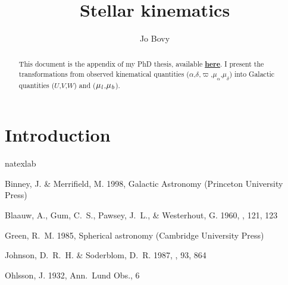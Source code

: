 \documentclass[12pt,preprint]{aastex}
\newcommand{\ra}{\ensuremath{\alpha}}
\newcommand{\dec}{\ensuremath{\delta}}
\newcommand{\pmra}{\ensuremath{\mu_{\ra}}}
\newcommand{\pmdec}{\ensuremath{\mu_{\dec}}}
\newcommand{\gall}{{\it l}}
\newcommand{\galb}{{\it b}}
\newcommand{\pmll}{\ensuremath{\mu_\gall}}
\newcommand{\pmbb}{\ensuremath{\mu_\galb}}
\newcommand{\galU}{\ensuremath{U}}
\newcommand{\galV}{\ensuremath{V}}
\newcommand{\galW}{\ensuremath{W}}
\newcommand{\parallax}{\ensuremath{\varpi}}
\begin{document}
\title{Stellar kinematics}
\author{
  Jo Bovy}

\begin{abstract}
This document is the appendix of my PhD thesis, available
{\bf \href{http://adsabs.harvard.edu/abs/2011PhDT........86B}{here}}. I
present the transformations from observed kinematical quantities
(\ra,\dec,\parallax,\pmra,\pmdec) into Galactic quantities
(\galU,\galV,\galW) and (\pmll,\pmbb).
\end{abstract}



\section{Introduction}








\begin{thebibliography}{5}
\expandafter\ifx\csname natexlab\endcsname\relax\def\natexlab#1{#1}\fi

{Binney}, J. \& {Merrifield}, M. 1998, {Galactic Astronomy} (Princeton
  University Press)

{Blaauw}, A., {Gum}, C.~S., {Pawsey}, J.~L., \& {Westerhout}, G. 1960, \mnras,
  121, 123

{Green}, R.~M. 1985, {Spherical astronomy} (Cambridge University Press)

{Johnson}, D.~R.~H. \& {Soderblom}, D.~R. 1987, \aj, 93, 864

{Ohlsson}, J. 1932, Ann.~Lund Obs., 6

\end{thebibliography}
\end{document}
